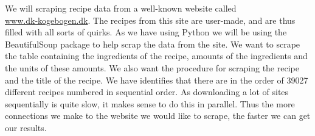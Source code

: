 \documentclass{article}
\begin{document}
We will scraping recipe data from a well-known website called \\\url{www.dk-kogebogen.dk}.
The recipes from this site are user-made, and are thus filled with all sorts of quirks. As
we have using Python we will be using the BeautifulSoup package to help scrap the data from the
site. We want to scrape the table containing the ingredients of the recipe, amounts of the
ingredients and the units of these amounts. We also want the procedure for scraping the
recipe and the title of the recipe. We have identifies that there are in the order of
39027 different recipes numbered in sequential order. As downloading a lot of sites
sequentially is quite slow, it makes sense to do this in parallel. Thus the more
connections we make to the website we would like to scrape, the faster we can get our
results.
\end{document}
